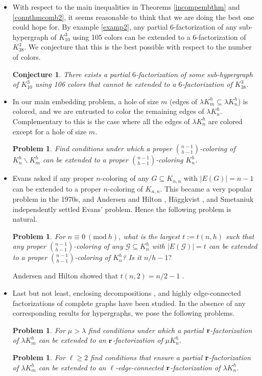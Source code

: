 \documentclass[12pt,oneside]{amsart}
\newtheorem{conjecture}[theorem]{Conjecture}
\newtheorem{question}[theorem]{Problem}
\newcommand{\Mod}[1]{\ (\mathrm{mod}\ #1)}
\newcommand{\cc}{\mathcal}
\begin{document}
\begin{itemize}
\item With respect to the main inequalities in Theorems \ref{incompembthm} and \ref{connthmcomb2}, it seems reasonable to think that we are doing the best one could hope for.  By example \ref{examp2}, any partial $6$-factorization of any sub-hypergraph of $K_{10}^3$ using 105 colors can be extended to a $6$-factorization of $K_{38}^3$. We conjecture that this is the best possible with respect to the number of colors.
\begin{conjecture}
There exists a  partial $6$-factorization of some sub-hypergraph of $K_{10}^3$ using 106 colors that cannot be extended to a $6$-factorization of $K_{38}^3$. 
\end{conjecture}




\item In our main embedding problem, a hole of size $m$ (edges of $\lambda K_m^h\subseteq \lambda K_n^h$) is colored, and we are entrusted to color the remaining edges of $\lambda K_n^h$. Complementary to this is the case where all the edges of $\lambda K_n^h$ are colored except for a hole of size $m$.
\begin{question}
Find conditions under which  a proper $\binom{n-1}{h-1}$-coloring of $K_n^h\backslash K_m^h$ can be extended to a proper $\binom{n-1}{h-1}$-coloring $K_n^h$. 
\end{question}  
  
\item Evans \cite{MR122728} asked if any proper $n$-coloring of any  $G\subseteq K_{n,n}$ with $|E(G)|=n-1$ can be extended to a proper $n$-coloring of $K_{n,n}$. This became a very popular problem in the 1970s, and Andersen and Hilton \cite{MR716801},    H\"{a}ggkvist \cite{MR519287}, and   Smetaniuk \cite{MR629869}  independently settled Evans' problem. Hence the following problem is natural. 
\begin{question}
For $n\equiv 0 \Mod h$,  what is the largest  $t:=t(n,h)$ such that any proper $\binom{n-1}{h-1}$-coloring of any $\cc G\subseteq K_n^h$ with $|E(\cc G)|=t$ can be extended to a proper $\binom{n-1}{h-1}$-coloring of $K_n^h$? Is it $n/h-1?$
\end{question}
Andersen and Hilton showed that $t(n,2)=n/2-1$ \cite{MR1276827}.  


\item Last but not least,  enclosing decompositions \cite{MR3952136, MR3782232, MR3326169, MR2608434}, and highly edge-connected factorizations of complete graphs \cite{MR2325799, MR2071906} have been  studied. In the absence of any corresponding results for hypergraphs, we pose the following problems. 
\begin{question}
For $\mu > \lambda$ find conditions under which  a partial $\vb r$-factorization of $\lambda K_m^h$ can be extended to an $\vb r$-factorization of $\mu K_n^h$. 
\end{question}
\begin{question}
For $\ell \geq 2$ find conditions that ensure  a partial $\vb r$-factorization of $\lambda K_m^h$ can be extended to an $\ell$-edge-connected $\vb r$-factorization of $\lambda K_n^h$. 
\end{question}



\end{itemize}
\end{document}
